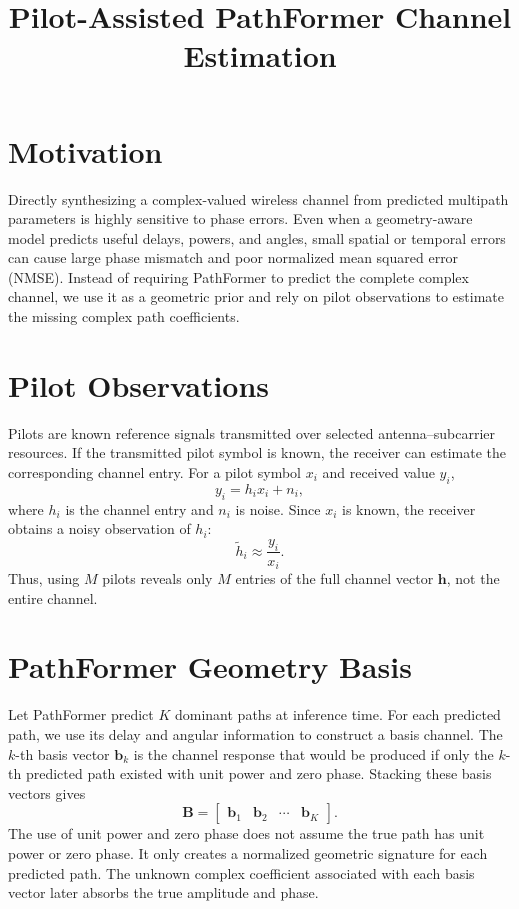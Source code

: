 \documentclass[10pt,conference]{IEEEtran}
\begin{document}
\title{Pilot-Assisted PathFormer Channel Estimation}
\author{}
\maketitle

\section{Motivation}

Directly synthesizing a complex-valued wireless channel from predicted multipath parameters is highly sensitive to phase errors. Even when a geometry-aware model predicts useful delays, powers, and angles, small spatial or temporal errors can cause large phase mismatch and poor normalized mean squared error (NMSE). Instead of requiring PathFormer to predict the complete complex channel, we use it as a geometric prior and rely on pilot observations to estimate the missing complex path coefficients.

\section{Pilot Observations}

Pilots are known reference signals transmitted over selected antenna--subcarrier resources. If the transmitted pilot symbol is known, the receiver can estimate the corresponding channel entry. For a pilot symbol $x_i$ and received value $y_i$,
\begin{equation}
    y_i = h_i x_i + n_i,
\end{equation}
where $h_i$ is the channel entry and $n_i$ is noise. Since $x_i$ is known, the receiver obtains a noisy observation of $h_i$:
\begin{equation}
    \tilde{h}_i \approx \frac{y_i}{x_i}.
\end{equation}
Thus, using $M$ pilots reveals only $M$ entries of the full channel vector $\mathbf{h}$, not the entire channel.

\section{PathFormer Geometry Basis}

Let PathFormer predict $K$ dominant paths at inference time. For each predicted path, we use its delay and angular information to construct a basis channel. The $k$-th basis vector $\mathbf{b}_k$ is the channel response that would be produced if only the $k$-th predicted path existed with unit power and zero phase. Stacking these basis vectors gives
\begin{equation}
    \mathbf{B}
    =
    \begin{bmatrix}
    \mathbf{b}_1 & \mathbf{b}_2 & \cdots & \mathbf{b}_K
    \end{bmatrix}.
\end{equation}
The use of unit power and zero phase does not assume the true path has unit power or zero phase. It only creates a normalized geometric signature for each predicted path. The unknown complex coefficient associated with each basis vector later absorbs the true amplitude and phase.
\end{document}
